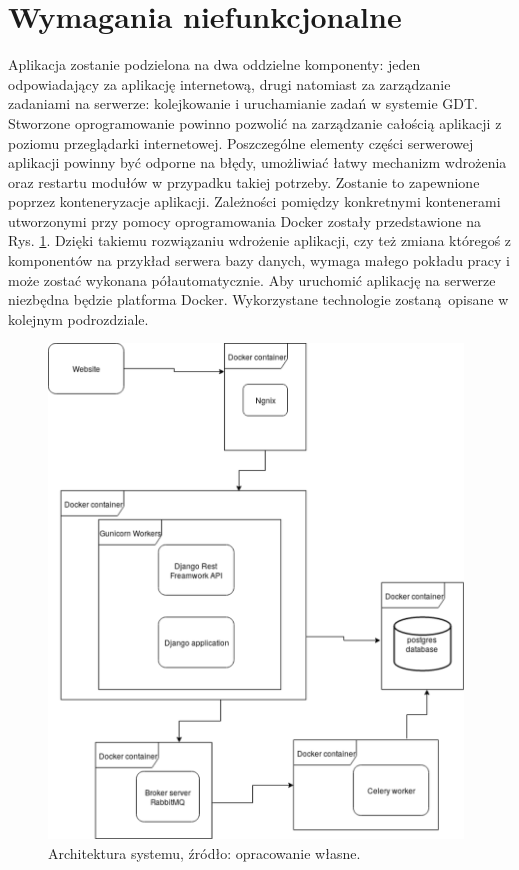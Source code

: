 \section{Wymagania niefunkcjonalne}
Aplikacja zostanie podzielona na dwa oddzielne komponenty: jeden odpowiadający za aplikację internetową, drugi natomiast za zarządzanie zadaniami na serwerze: kolejkowanie i uruchamianie zadań w systemie GDT. Stworzone oprogramowanie powinno pozwolić na zarządzanie całością aplikacji z poziomu przeglądarki internetowej. Poszczególne elementy części serwerowej aplikacji powinny być odporne na błędy, umożliwiać łatwy mechanizm wdrożenia oraz restartu modułów w przypadku takiej potrzeby. Zostanie to zapewnione poprzez konteneryzacje aplikacji. Zależności pomiędzy konkretnymi kontenerami utworzonymi przy pomocy oprogramowania Docker zostały przedstawione na Rys. \ref{rys3_architektura_systemu}. Dzięki takiemu rozwiązaniu wdrożenie aplikacji, czy też zmiana któregoś z komponentów na przykład serwera bazy danych, wymaga małego pokładu pracy i może zostać wykonana półautomatycznie. Aby uruchomić aplikację na serwerze niezbędna będzie platforma Docker. Wykorzystane technologie zostaną opisane w kolejnym podrozdziale.

\begin{figure}[htb]
	\centering
	\includegraphics[width=11cm]{grafika/architektura_systemu.eps}
	\caption{Architektura systemu, źródło: opracowanie własne.}
	\label{rys3_architektura_systemu}
\end{figure}

